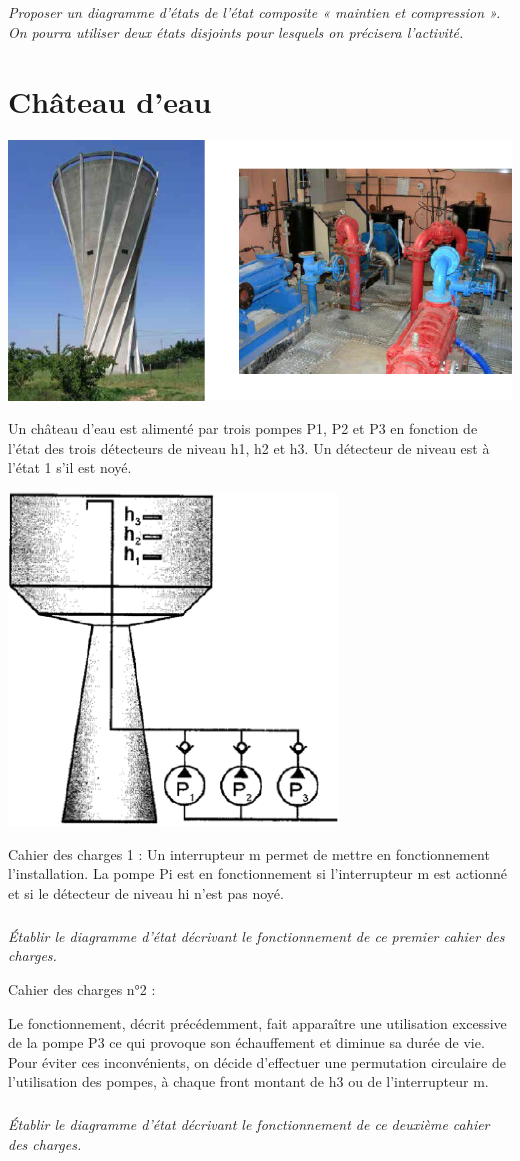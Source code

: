 \documentclass[10pt]{article}
\begin{document}
\subparagraph{}
\textit{Proposer un diagramme d’états de l’état composite « maintien et compression ». On pourra utiliser deux états disjoints pour lesquels on précisera l’activité.}

\section*{Château d'eau}
\begin{center}
\includegraphics[width=.5\textwidth]{images/fig_14}
\end{center}
\setcounter{subparagraph}{0}

Un château d’eau est alimenté par trois pompes P1, P2 et P3 en fonction de l’état des trois
détecteurs de niveau h1, h2 et h3. Un détecteur de niveau est à l’état 1 s’il est noyé.

\begin{center}
\includegraphics[width=.5\textwidth]{images/fig_15}
\end{center}


Cahier des charges 1 :
Un interrupteur m permet de mettre en fonctionnement l’installation.
La pompe Pi est en fonctionnement si l’interrupteur m est actionné et si le détecteur de niveau hi
n’est pas noyé.

\subparagraph{}
\textit{Établir le diagramme d’état décrivant le fonctionnement de ce premier cahier des
charges.}

Cahier des charges n°2 :

Le fonctionnement, décrit précédemment, fait apparaître une utilisation excessive de la pompe
P3 ce qui provoque son échauffement et diminue sa durée de vie. Pour éviter ces inconvénients,
on décide d’effectuer une permutation circulaire de l’utilisation des pompes, à chaque front
montant de h3 ou de l’interrupteur m.

\subparagraph{}
\textit{Établir le diagramme d’état décrivant le fonctionnement de ce deuxième cahier des
charges.}
\end{document}
